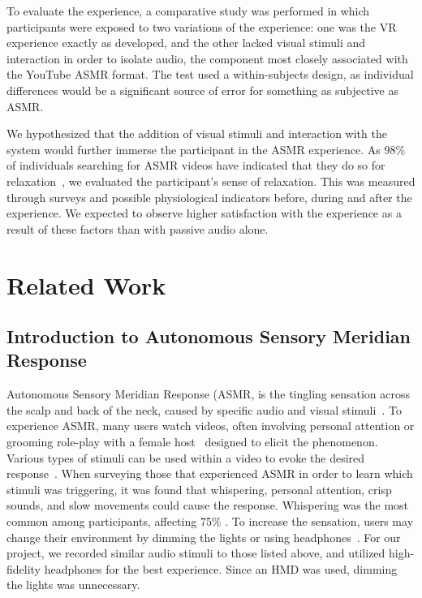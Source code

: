 \documentclass{sigchi}
\begin{document}
To evaluate the experience, a comparative study was performed in which participants were exposed to two variations of the experience: one was the VR experience exactly as developed, and the other lacked visual stimuli and interaction in order to isolate audio, the component most closely associated with the YouTube ASMR format. The test used a within-subjects design, as individual differences would be a significant source of error for something as subjective as ASMR.

We hypothesized that the addition of visual stimuli and interaction with the system would further immerse the participant in the ASMR experience. As 98\% of individuals searching for ASMR videos have indicated that they do so for relaxation~\cite{barratt2015autonomous}, we evaluated the participant's sense of relaxation. This was measured through surveys and possible physiological indicators before, during and after the experience. We expected to observe higher satisfaction with the experience as a result of these factors than with passive audio alone.

\section{Related Work}

\subsection{Introduction to Autonomous Sensory Meridian Response}
Autonomous Sensory Meridian Response (ASMR, is the tingling sensation across the scalp and back of the neck, caused by specific audio and visual stimuli~\cite{barratt2015autonomous}. To experience ASMR, many users watch videos, often involving personal attention or grooming role-play \cite{andersen2015now,barratt2015autonomous} with a female host~\cite{andersen2015now} designed to elicit the phenomenon. Various types of stimuli can be used within a video to evoke the desired response~\cite{barratt2015autonomous}. When surveying those that experienced ASMR in order to learn which stimuli was triggering, it was found that whispering, personal attention, crisp sounds, and slow movements could cause the response. Whispering was the most common among participants, affecting 75\% \cite{barratt2015autonomous}. To increase the sensation, users may change their environment by dimming the lights or using headphones~\cite{begman2015}. For our project, we recorded similar audio stimuli to those listed above, and utilized high-fidelity headphones for the best experience. Since an HMD was used, dimming the lights was unnecessary.
\end{document}
